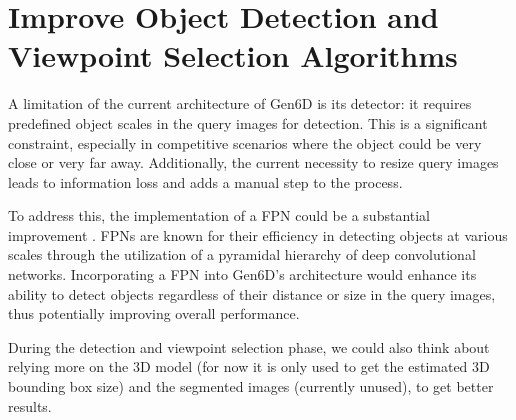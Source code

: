 \section{Improve Object Detection and Viewpoint Selection Algorithms}

A limitation of the current architecture of Gen6D is its detector: it requires predefined object scales in the query images for detection. This is a significant constraint, especially in competitive scenarios where the object could be very close or very far away. Additionally, the current necessity to resize query images leads to information loss and adds a manual step to the process.

To address this, the implementation of a \ac{FPN} could be a substantial improvement \cite{lin2017feature}. \ac{FPN}s are known for their efficiency in detecting objects at various scales through the utilization of a pyramidal hierarchy of deep convolutional networks. Incorporating a \ac{FPN} into Gen6D's architecture would enhance its ability to detect objects regardless of their distance or size in the query images, thus potentially improving overall performance.

During the detection and viewpoint selection phase, we could also think about relying more on the 3D model (for now it is only used to get the estimated 3D bounding box size) and the segmented images (currently unused), to get better results.
